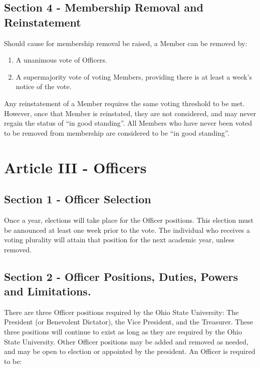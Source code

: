 \documentclass{article}
\begin{document}
	\subsection{Section 4 - Membership Removal and Reinstatement}

	Should cause for membership removal be raised, a Member can be removed by:

	\begin{enumerate}
		\item A unanimous vote of Officers.
		\item A supermajority vote of voting Members, providing there is at least a week's notice of the vote.
	\end{enumerate}

  Any reinstatement of a Member requires the same voting threshold to be met. However, once that Member is reinstated, they are not considered, and may never regain the status of ``in good standing''. All Members who have never been voted to be removed from membership are considered to be ``in good standing''.

	\section{Article III - Officers}

	\subsection{Section 1 - Officer Selection}

	Once a year, elections will take place for the Officer positions.  This election must be announced at least one week prior to the vote.  The individual who receives a voting plurality will attain that position for the next academic year, unless removed.

	\subsection{Section 2 - Officer Positions, Duties, Powers and Limitations.}

	There are three Officer positions required by the Ohio State University: The President (or Benevolent Dictator), the Vice President, and the Treasurer.  These three positions will continue to exist as long as they are required by the Ohio State University. Other Officer positions may be added and removed as needed, and may be open to election or appointed by the president. An Officer is required to be:
\end{document}
